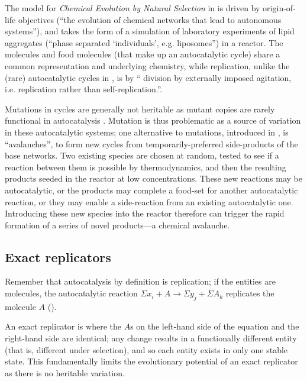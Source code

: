 The model for \emph{Chemical Evolution by Natural Selection} in \textcite{Fernando:2007pf, Fernando:2008xy} is driven by origin-of-life objectives (``the evolution of chemical networks that lead to autonomous systems''), and takes the form of a simulation of laboratory experiments of lipid aggregates (``phase separated ‘individuals’, e.g. liposomes'') in a reactor. The molecules and food molecules (that make up an autocatalytic cycle) share a common representation and underlying chemistry, while replication, unlike the (rare) autocatalytic cycles in \textcite{Faulconbridge2011}, is by `` division by externally imposed agitation, i.e. replication rather than self-replication.''.

Mutations in cycles are generally not heritable as mutant copies are rarely functional in autocatalysis \parencite{Vasas2012a}. Mutation is thus problematic as a source of variation in these autocatalytic systems; one alternative to mutations, introduced in \textcite{Fernando:2007pf},  is ``avalanches'', to form new cycles from temporarily-preferred side-products of the base networks. Two existing species are chosen at random, tested to see if a reaction between them is possible by thermodynamics, and then the resulting products seeded in the reactor at low concentrations. These new reactions may be autocatalytic, or the products may complete a food-set for another autocatalytic reaction, or they may enable a side-reaction from an existing autocatalytic one. Introducing these new species into the reactor therefore can trigger the rapid formation of a series of novel products---a chemical avalanche.

\subsection{Exact replicators}\label{non-informational-exact-replicators}

Remember that autocatalysis by definition is replication; if the entities are molecules, the autocatalytic reaction $\Sigma x_i + A\rightarrow \Sigma y_j + \Sigma A_k$ replicates the molecule $A$ (\eg \textcite{Lifson1997}). 

An exact replicator is where the $A$s on the left-hand side of the equation and the right-hand side are identical; any change results in a functionally different entity (that is, different under selection), and so each entity exists in only one stable state. This fundamentally limits the evolutionary potential of an exact replicator as there is no heritable variation. 


